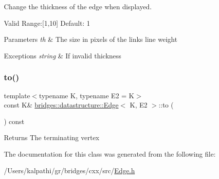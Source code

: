 Change the thickness of the edge when displayed. 

Valid Range\+:\mbox{[}1,10\mbox{]} Default\+: 1


\begin{DoxyParams}{Parameters}
{\em th} & The size in pixels of the link\textquotesingle{}s line weight \\
\hline
\end{DoxyParams}

\begin{DoxyExceptions}{Exceptions}
{\em string} & If invalid thickness \\
\hline
\end{DoxyExceptions}
\mbox{\label{classbridges_1_1datastructure_1_1_edge_a2cece2762a29e3fc18859e0c725eee82}} 
\subsubsection{\texorpdfstring{to()}{to()}}
{\footnotesize\ttfamily template$<$typename K, typename E2 = K$>$ \\
const K\& \mbox{\hyperlink{classbridges_1_1datastructure_1_1_edge}{bridges\+::datastructure\+::\+Edge}}$<$ K, E2 $>$\+::to (\begin{DoxyParamCaption}{ }\end{DoxyParamCaption}) const\hspace{0.3cm}{\ttfamily [inline]}}

\begin{DoxyReturn}{Returns}
The terminating vertex 
\end{DoxyReturn}


The documentation for this class was generated from the following file\+:\begin{DoxyCompactItemize}
\item 
/\+Users/kalpathi/gr/bridges/cxx/src/\mbox{\hyperlink{_edge_8h}{Edge.\+h}}\end{DoxyCompactItemize}
